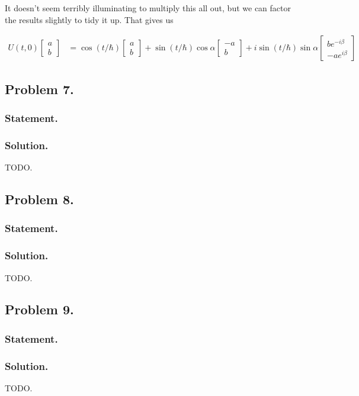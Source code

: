 It doesn't seem terribly illuminating to multiply this all out, but we can factor the results slightly to tidy it up.  That gives us

\begin{align}\label{eqn:desaiCh5:650}
U(t,0) 
\begin{bmatrix}
a \\
b
\end{bmatrix}
&=
\cos(t/\hbar)
\begin{bmatrix}
a \\
b
\end{bmatrix}
+ 
\sin(t/\hbar) \cos\alpha
\begin{bmatrix}
-a \\
b
\end{bmatrix}
+ i
\sin(t/\hbar) \sin\alpha
\begin{bmatrix}
b e^{-i\beta} \\
-a e^{i \beta}
\end{bmatrix}
\end{align}

\subsection{Problem 7.}
\subsubsection{Statement.}
\subsubsection{Solution.}

TODO.

\subsection{Problem 8.}
\subsubsection{Statement.}
\subsubsection{Solution.}

TODO.

\subsection{Problem 9.}
\subsubsection{Statement.}
\subsubsection{Solution.}

TODO.

\EndArticle

